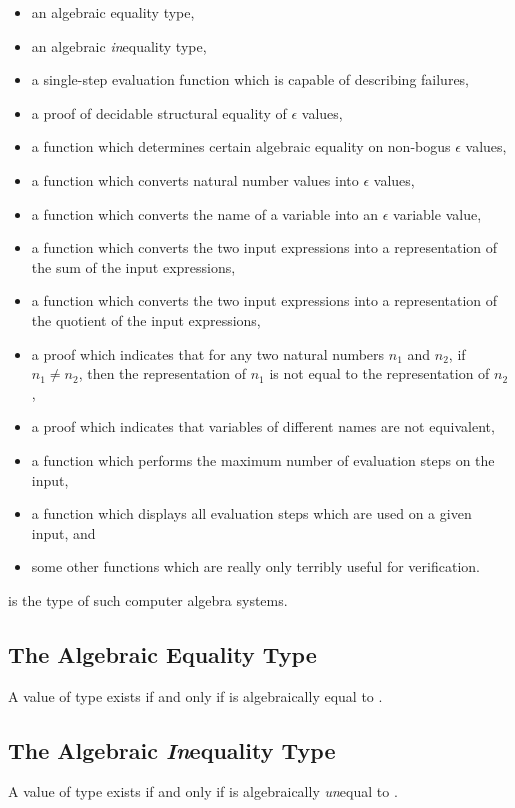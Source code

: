 \documentclass{report}
\begin{document}
\begin{itemize}
  \item an algebraic equality type,
  \item an algebraic \emph{in}equality type,
  \item a single-step evaluation function which is capable of describing failures,
  \item a proof of decidable structural equality of \(\epsilon\) values,
  \item a function which determines certain algebraic equality on non-bogus \(\epsilon\) values,
  \item a function which converts natural number values into \(\epsilon\) values,
  \item a function which converts the name of a variable into an \(\epsilon\) variable value,
  \item a function which converts the two input expressions into a representation of the sum of the input expressions,
  \item a function which converts the two input expressions into a representation of the quotient of the input expressions,
  \item a proof which indicates that for any two natural numbers \(n_1\) and \(n_2\), if \(n_1 \neq n_2\), then the representation of \(n_1\) is not equal to the representation of \(n_2\),
  \item a proof which indicates that variables of different names are not equivalent,
  \item a function which performs the maximum number of evaluation steps on the input,
  \item a function which displays all evaluation steps which are used on a given input, and
  \item some other functions which are really only terribly useful for verification.
\end{itemize}

 is the type of such computer algebra systems.

\subsection{The Algebraic Equality Type}
A value of type     exists if and only if  is algebraically equal to .

\subsection{The Algebraic \emph{In}equality Type}
A value of type     exists if and only if  is algebraically \emph{un}equal to .
\end{document}
